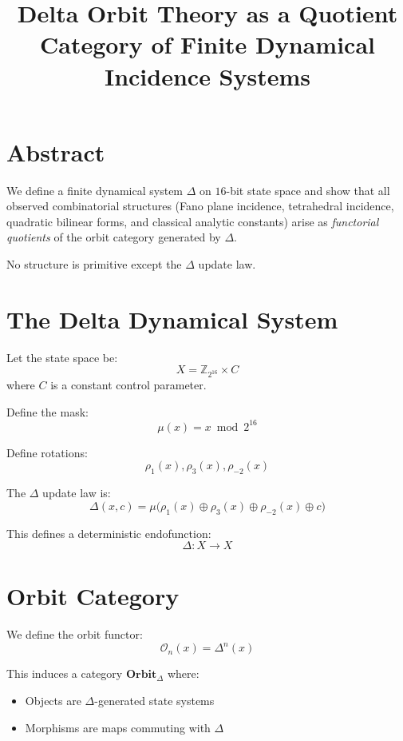 \documentclass[11pt]{article}
\title{Delta Orbit Theory as a Quotient Category of Finite Dynamical Incidence Systems}
\author{}
\date{}
\begin{document}
\maketitle

\section{Abstract}

We define a finite dynamical system $\Delta$ on $16$-bit state space and show that all observed combinatorial structures
(Fano plane incidence, tetrahedral incidence, quadratic bilinear forms, and classical analytic constants)
arise as \emph{functorial quotients} of the orbit category generated by $\Delta$.

No structure is primitive except the $\Delta$ update law.

\section{The Delta Dynamical System}

Let the state space be:
\[
X = \mathbb{Z}_{2^{16}} \times C
\]
where $C$ is a constant control parameter.

Define the mask:
\[
\mu(x) = x \bmod 2^{16}
\]

Define rotations:
\[
\rho_1(x), \rho_3(x), \rho_{-2}(x)
\]

The $\Delta$ update law is:
\[
\Delta(x,c) =
\mu\Big(
\rho_1(x) \oplus \rho_3(x) \oplus \rho_{-2}(x) \oplus c
\Big)
\]

This defines a deterministic endofunction:
\[
\Delta : X \to X
\]

\section{Orbit Category}

We define the orbit functor:
\[
\mathcal{O}_n(x) = \Delta^n(x)
\]

This induces a category $\mathbf{Orbit}_{\Delta}$ where:

\begin{itemize}
\item Objects are $\Delta$-generated state systems
\item Morphisms are maps commuting with $\Delta$
\end{itemize}
\end{document}
